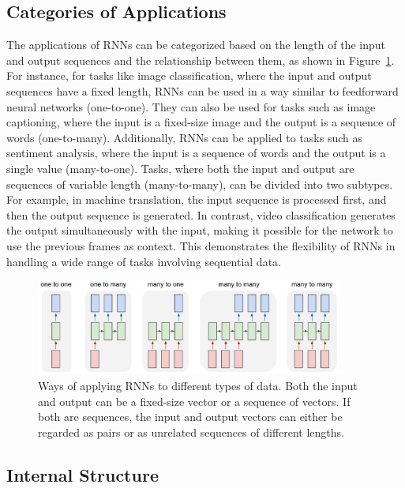 \documentclass{article}
\newcommand{\reffig}[1]{Figure~\ref{#1}}
\begin{document}
\subsection{Categories of Applications}
\label{sec:2.0}

The applications of RNNs can be categorized based on the length of the input and output
sequences and the relationship between them, as shown in
\reffig{fig:rnn-application-types}. For instance, for tasks like image classification,
where the input and output sequences have a fixed length, RNNs can be used in a way
similar to feedforward neural networks (one-to-one). They can also be used for tasks such
as image captioning, where the input is a fixed-size image and the output is a sequence of
words (one-to-many). Additionally, RNNs can be applied to tasks such as sentiment
analysis, where the input is a sequence of words and the output is a single value
(many-to-one). Tasks, where both the input and output are sequences of variable length
(many-to-many), can be divided into two subtypes. For example, in machine translation, the
input sequence is processed first, and then the output sequence is generated. In contrast,
video classification generates the output simultaneously with the input, making it
possible for the network to use the previous frames as context. This demonstrates the
flexibility of RNNs in handling a wide range of tasks involving sequential data.

\begin{figure}[htbp]
  \centering
  \includegraphics[width=0.9\textwidth]{Karpathy application types.jpeg}
  \caption{Ways of applying RNNs to different types of data. Both the input and output can
    be a fixed-size vector or a sequence of vectors. If both are sequences, the input and
    output vectors can either be regarded as pairs or as unrelated sequences of different
    lengths. \cite{karpathyUnreasonableEffectivenessRecurrent}}
  \label{fig:rnn-application-types}
\end{figure}


\subsection{Internal Structure}
\label{sec:2.1}
\end{document}
